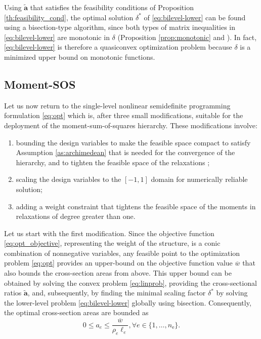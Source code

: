 \documentclass[final,onefignum,onetabnum]{siamart220329}
\begin{document}
Using $\tilde{\mathbf{a}}$ that satisfies the {feasibility} conditions of Proposition \ref{th:feasibility_cond}, the optimal solution $\delta^*$ of {\eqref{eq:bilevel-lower}} can be found using a bisection-type algorithm, since both types of matrix inequalities in \eqref{eq:bilevel-lower} are monotonic in $\delta$ (Proposition \ref{prop:monotonic} and \cite[Propositon 1]{Tyburec2023}). In fact, \eqref{eq:bilevel-lower} is therefore a quasiconvex optimization problem because $\delta$ is a minimized upper bound on monotonic functions.

\subsection{Moment-SOS}\label{sec:msos}

Let us now return to the single-level nonlinear semidefinite programming formulation \eqref{eq:opt} which is, after three small modifications, suitable for the deployment of the moment-sum-of-squares hierarchy. These modifications involve:
\begin{enumerate}
	\item bounding the design variables to make the feasible space compact to satisfy Assumption \ref{as:archimedean} that is needed for the convergence of the hierarchy, and to tighten the feasible space of the relaxations \cite[Appendix 2]{Tyburec2021};
	\item scaling the design variables to the $[-1,1]$ domain for numerically reliable solution;
        \item adding a weight constraint that tightens the feasible space of the moments in relaxations of degree greater than one.
\end{enumerate}
%
{Let us start with the first modification.} Since the objective function \eqref{eq:opt_objective}, representing the weight of the structure, is a conic combination of nonnegative variables, any feasible point to the optimization problem \eqref{eq:opt} provides an upper-bound on  the objective function value $\overline{w}$ that also bounds the cross-section areas from above. This upper bound can be obtained by solving the convex problem \eqref{eq:linprob}, providing the cross-sectional ratios $\tilde{\mathbf{a}}$, and{, subsequently,} by finding the minimal scaling factor $\delta^*$ by solving the lower-level problem \eqref{eq:bilevel-lower} globally using bisection. Consequently, the optimal cross-section areas are bounded as
%
\begin{equation}
	0 \le a_e \le \frac{\overline{w}}{\rho_e\ell_e}, \forall e \in \{1,\dots,n_\mathrm{e}\}.
\end{equation}
\end{document}
